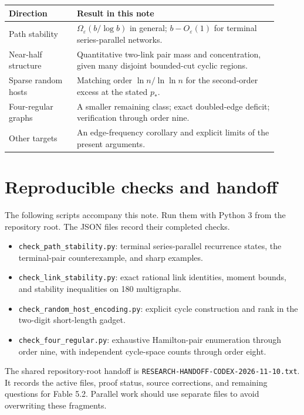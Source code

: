 \documentclass[11pt]{article}
\begin{document}
\begin{center}
\small
\begin{tabular}{p{0.23\linewidth}p{0.68\linewidth}}
\toprule
Direction & Result in this note\\
\midrule
Path stability & $\Omega_\varepsilon(b/\log b)$ in general; $b-O_\varepsilon(1)$ for terminal series-parallel networks.\\[3pt]
Near-half structure & Quantitative two-link pair mass and concentration, given many disjoint bounded-cut cyclic regions.\\[3pt]
Sparse random hosts & Matching order $\ln n/\ln\ln n$ for the second-order excess at the stated $p_*$.\\[3pt]
Four-regular graphs & A smaller remaining class; exact doubled-edge deficit; verification through order nine.\\[3pt]
Other targets & An edge-frequency corollary and explicit limits of the present arguments.\\
\bottomrule
\end{tabular}
\end{center}







\section{Reproducible checks and handoff}

The following scripts accompany this note.
Run them with Python 3 from the repository root.
The JSON files record their completed checks.

\begin{itemize}
\item \texttt{check\_path\_stability.py}: terminal series-parallel recurrence states, the terminal-pair counterexample, and sharp examples.
\item \texttt{check\_link\_stability.py}: exact rational link identities, moment bounds, and stability inequalities on 180 multigraphs.
\item \texttt{check\_random\_host\_encoding.py}: explicit cycle construction and rank in the two-digit short-length gadget.
\item \texttt{check\_four\_regular.py}: exhaustive Hamilton-pair enumeration through order nine, with independent cycle-space counts through order eight.
\end{itemize}

The shared repository-root handoff is \texttt{RESEARCH-HANDOFF-CODEX-2026-11-10.txt}.
It records the active files, proof status, source corrections, and remaining questions for Fable 5.2.
Parallel work should use separate files to avoid overwriting these fragments.
\end{document}
